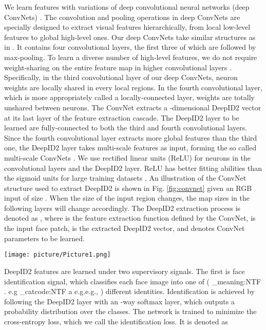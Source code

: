 \documentclass{article} \usepackage{nips14submit_e,times}
\makeatletter
\newcommand\latinabbrev[1]{
  \peek_meaning:NTF . {#1\@}{ \peek_catcode:NTF a {#1.\@ }{#1.\@}}}
\def\eg{\latinabbrev{e.g}}
\makeatother
\begin{document}
We learn features with variations of deep convolutional neural networks (deep ConvNets) \cite{lecun1998}. The convolution and pooling operations in deep ConvNets are specially designed to extract visual features hierarchically, from local low-level features to global high-level ones. Our deep ConvNets take similar structures as in \cite{sun2014}. It contains four convolutional layers, the first three of which are followed by max-pooling. To learn a diverse number of high-level features, we do not require weight-sharing on the entire feature map in higher convolutional layers \cite{huang2012}. Specifically, in the third convolutional layer of our deep ConvNets, neuron weights are locally shared in every  local regions. In the fourth convolutional layer, which is more appropriately called a locally-connected layer, weights are totally unshared between neurons. The ConvNet extracts a -dimensional DeepID2 vector at its last layer of the feature extraction cascade. The DeepID2 layer to be learned are fully-connected to both the third and fourth convolutional layers. Since the fourth convolutional layer extracts more global features than the third one, the DeepID2 layer takes multi-scale features as input, forming the so called multi-scale ConvNets \cite{sermanet2011}. We use rectified linear units (ReLU) \cite{nair2010} for neurons in the convolutional layers and the DeepID2 layer. ReLU has better fitting abilities than the sigmoid units for large training datasets \cite{krizhevsky2012}. An illustration of the ConvNet structure used to extract DeepID2 is shown in Fig. \ref{fig:convnet} given an RGB input of size . When the size of the input region changes, the map sizes in the following layers will change accordingly. The DeepID2 extraction process is denoted as , where  is the feature extraction function defined by the ConvNet,  is the input face patch,  is the extracted DeepID2 vector, and  denotes ConvNet parameters to be learned.

\begin{figure*}[t]
\begin{center}
\texttt{[image: picture/Picture1.png]}
\end{center}
\vspace{-0.2in}
\caption{The ConvNet structure for DeepID2 extraction.}
\label{fig:convnet}
\vspace{-0.0in}
\end{figure*}

DeepID2 features are learned under two supervisory signals. The first is face identification signal, which classifies each face image into one of  (\eg, ) different identities. Identification is achieved by following the DeepID2 layer with an -way softmax layer, which outputs a probability distribution over the  classes. The network is trained to minimize the cross-entropy loss, which we call the identification loss. It is denoted as
\end{document}
